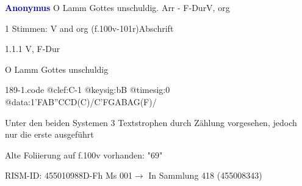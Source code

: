 \documentclass[twocolumn, 12pt]{book}
\begin{document}
\par \vspace{16pt} \textcolor{darkblue}{\textbf{Anonymus  }}\hfillplus{\textbf{[189]}}\newline O Lamm Gottes unschuldig. Arr - F-Dur\newline V, org
\par \begin{itshape}\end{itshape} 
\par \textcolor{darkblue}{}  1 Stimmen: V and org  (f.100v-101r)\newline Abschrift
\par 1.1.1  V, F-Dur\newline \begin{footnotesize} O Lamm Gottes unschuldig \end{footnotesize}  
\begin{filecontents*}{189-1.code}
@clef:C-1
@keysig:bB
@timesig:0
@data:1'FAB''CCD(C)/C'FGABAG(F)/
\end{filecontents*}
\newline %
\par Unter den beiden Systemen 3 Textstrophen durch Zählung vorgesehen, jedoch nur die erste ausgeführt
\par Alte Foliierung auf f.100v vorhanden: "69"
\par RISM-ID: 455010988\newline D-Fh  Ms 001\newline $\rightarrow$ In Sammlung 418 (455008343)
      
\end{document}
